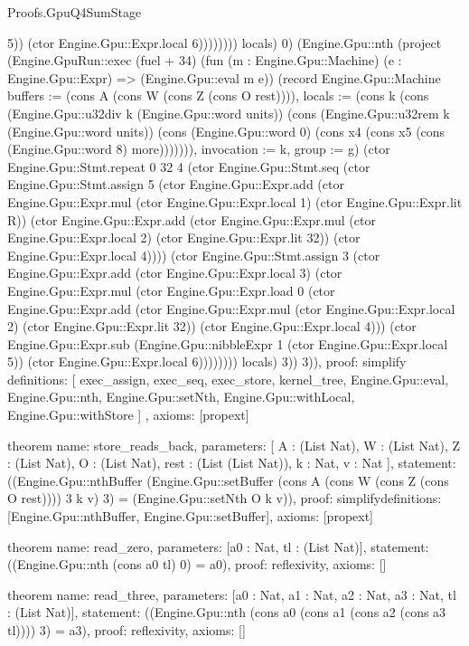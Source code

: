 \begin{lexlean}{Proofs.GpuQ4SumStage}
\begin{semanticmodule}
{5)) (ctor Engine.Gpu::Expr.local 6)))))))) locals) 0) (Engine.Gpu::nth (project (Engine.GpuRun::exec (fuel + 34) (fun (m : Engine.Gpu::Machine) (e : Engine.Gpu::Expr) => (Engine.Gpu::eval m e)) (record Engine.Gpu::Machine {buffers := (cons A (cons W (cons Z (cons O rest)))), locals := (cons k (cons (Engine.Gpu::u32div k (Engine.Gpu::word units)) (cons (Engine.Gpu::u32rem k (Engine.Gpu::word units)) (cons (Engine.Gpu::word 0) (cons x4 (cons x5 (cons (Engine.Gpu::word 8) more))))))), invocation := k, group := g}) (ctor Engine.Gpu::Stmt.repeat 0 32 4 (ctor Engine.Gpu::Stmt.seq (ctor Engine.Gpu::Stmt.assign 5 (ctor Engine.Gpu::Expr.add (ctor Engine.Gpu::Expr.mul (ctor Engine.Gpu::Expr.local 1) (ctor Engine.Gpu::Expr.lit R)) (ctor Engine.Gpu::Expr.add (ctor Engine.Gpu::Expr.mul (ctor Engine.Gpu::Expr.local 2) (ctor Engine.Gpu::Expr.lit 32)) (ctor Engine.Gpu::Expr.local 4)))) (ctor Engine.Gpu::Stmt.assign 3 (ctor Engine.Gpu::Expr.add (ctor Engine.Gpu::Expr.local 3) (ctor Engine.Gpu::Expr.mul (ctor Engine.Gpu::Expr.load 0 (ctor Engine.Gpu::Expr.add (ctor Engine.Gpu::Expr.mul (ctor Engine.Gpu::Expr.local 2) (ctor Engine.Gpu::Expr.lit 32)) (ctor Engine.Gpu::Expr.local 4))) (ctor Engine.Gpu::Expr.sub (Engine.Gpu::nibbleExpr 1 (ctor Engine.Gpu::Expr.local 5)) (ctor Engine.Gpu::Expr.local 6)))))))) locals) 3)) 3)),
  proof: simplify{
    definitions: [
      exec_assign,
      exec_seq,
      exec_store,
      kernel_tree,
      Engine.Gpu::eval,
      Engine.Gpu::nth,
      Engine.Gpu::setNth,
      Engine.Gpu::withLocal,
      Engine.Gpu::withStore
    ]
  },
  axioms: [propext]
}

theorem{
  name: store_reads_back,
  parameters: [
    A : (List Nat),
    W : (List Nat),
    Z : (List Nat),
    O : (List Nat),
    rest : (List (List Nat)),
    k : Nat,
    v : Nat
  ],
  statement: ((Engine.Gpu::nthBuffer (Engine.Gpu::setBuffer (cons A (cons W (cons Z (cons O rest)))) 3 k v) 3) = (Engine.Gpu::setNth O k v)),
  proof: simplify{definitions: [Engine.Gpu::nthBuffer, Engine.Gpu::setBuffer]},
  axioms: [propext]
}

theorem{
  name: read_zero,
  parameters: [a0 : Nat, tl : (List Nat)],
  statement: ((Engine.Gpu::nth (cons a0 tl) 0) = a0),
  proof: reflexivity{},
  axioms: []
}

theorem{
  name: read_three,
  parameters: [a0 : Nat, a1 : Nat, a2 : Nat, a3 : Nat, tl : (List Nat)],
  statement: ((Engine.Gpu::nth (cons a0 (cons a1 (cons a2 (cons a3 tl)))) 3) = a3),
  proof: reflexivity{},
  axioms: []
}


\end{semanticmodule}
\end{lexlean}
